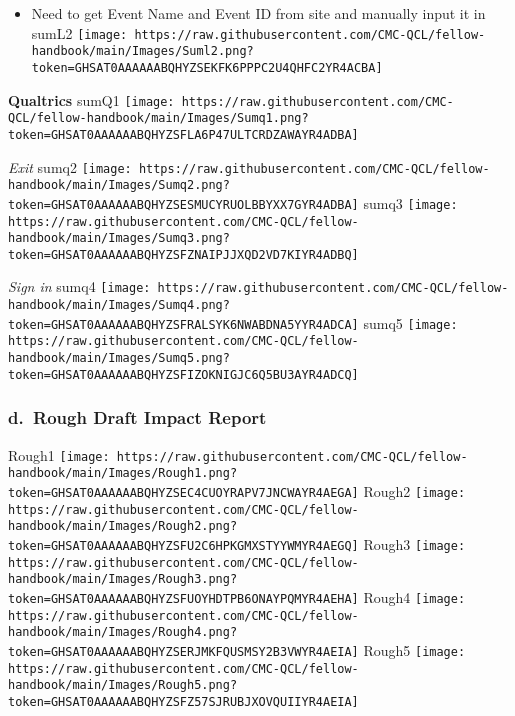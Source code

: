 \documentclass[
]{book}
\providecommand{\tightlist}{%
  \setlength{\itemsep}{0pt}\setlength{\parskip}{0pt}}
\begin{document}
\begin{itemize}
\tightlist
\item
  Need to get Event Name and Event ID from site and manually input it in
  sumL2
  \texttt{[image: https://raw.githubusercontent.com/CMC-QCL/fellow-handbook/main/Images/Suml2.png?token=GHSAT0AAAAAABQHYZSEKFK6PPPC2U4QHFC2YR4ACBA]}
\end{itemize}

\textbf{Qualtrics}
sumQ1
\texttt{[image: https://raw.githubusercontent.com/CMC-QCL/fellow-handbook/main/Images/Sumq1.png?token=GHSAT0AAAAAABQHYZSFLA6P47ULTCRDZAWAYR4ADBA]}

\emph{Exit}
sumq2
\texttt{[image: https://raw.githubusercontent.com/CMC-QCL/fellow-handbook/main/Images/Sumq2.png?token=GHSAT0AAAAAABQHYZSESMUCYRUOLBBYXX7GYR4ADBA]}
sumq3
\texttt{[image: https://raw.githubusercontent.com/CMC-QCL/fellow-handbook/main/Images/Sumq3.png?token=GHSAT0AAAAAABQHYZSFZNAIPJJXQD2VD7KIYR4ADBQ]}

\emph{Sign in}
sumq4
\texttt{[image: https://raw.githubusercontent.com/CMC-QCL/fellow-handbook/main/Images/Sumq4.png?token=GHSAT0AAAAAABQHYZSFRALSYK6NWABDNA5YYR4ADCA]}
sumq5
\texttt{[image: https://raw.githubusercontent.com/CMC-QCL/fellow-handbook/main/Images/Sumq5.png?token=GHSAT0AAAAAABQHYZSFIZOKNIGJC6Q5BU3AYR4ADCQ]}

\hypertarget{d.-rough-draft-impact-report}{%
\subsubsection{\texorpdfstring{d.~Rough Draft Impact Report }{d.~Rough Draft Impact Report }}\label{d.-rough-draft-impact-report}}

Rough1
\texttt{[image: https://raw.githubusercontent.com/CMC-QCL/fellow-handbook/main/Images/Rough1.png?token=GHSAT0AAAAAABQHYZSEC4CUOYRAPV7JNCWAYR4AEGA]}
Rough2
\texttt{[image: https://raw.githubusercontent.com/CMC-QCL/fellow-handbook/main/Images/Rough2.png?token=GHSAT0AAAAAABQHYZSFU2C6HPKGMXSTYYWMYR4AEGQ]}
Rough3
\texttt{[image: https://raw.githubusercontent.com/CMC-QCL/fellow-handbook/main/Images/Rough3.png?token=GHSAT0AAAAAABQHYZSFUOYHDTPB6ONAYPQMYR4AEHA]}
Rough4
\texttt{[image: https://raw.githubusercontent.com/CMC-QCL/fellow-handbook/main/Images/Rough4.png?token=GHSAT0AAAAAABQHYZSERJMKFQUSMSY2B3VWYR4AEIA]}
Rough5
\texttt{[image: https://raw.githubusercontent.com/CMC-QCL/fellow-handbook/main/Images/Rough5.png?token=GHSAT0AAAAAABQHYZSFZ57SJRUBJXOVQUIIYR4AEIA]}

  
\end{document}
